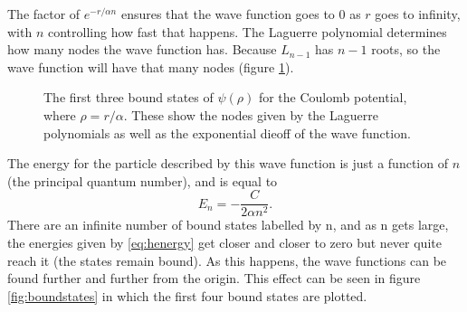 \documentclass[12pt,twoside]{reedthesis}
\newcommand{\eqn}[1]{\begin{equation}#1\end{equation}}
\begin{document}
The factor of $e^{-r /\alpha n}$ ensures that the wave function goes to 0 as $r$ goes to infinity, with $n$ controlling how fast that happens. The Laguerre polynomial determines how many nodes the wave function has. Because $L_{n-1}$ has $n-1$ roots, so the wave function will have that many nodes (figure \ref{fig:wavefunctions}).
\begin{figure}[h]
\centering
{}
\caption[The first three bound states of $\psi(\rho)$ for the Coulomb potential]{The first three bound states of $\psi(\rho)$ for the Coulomb potential, where $\rho = r/\alpha$. These show the nodes given by the Laguerre polynomials as well as the exponential dieoff of the wave function.}
\label{fig:wavefunctions}
\end{figure}

The energy for the particle described by this wave function is just a function of $n$ (the principal quantum number), and is equal to
\eqn{
E_n = -\frac{C}{2\alpha n^2}\mbox{.}
\label{eq:henergy}
}
There are an infinite number of bound states labelled by n, and as n gets large, the energies given by \eqref{eq:henergy} get closer and closer to zero but never quite reach it (the states remain bound). As this happens, the wave functions can be found further and further from the origin. This effect can be seen in figure \ref{fig:boundstates} in which the first four bound states are plotted.
\end{document}
